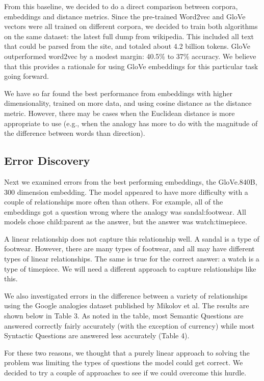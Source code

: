 \documentclass[11pt]{article}
\begin{document}
From this baseline, we decided to do a direct comparison between corpora,
embeddings and distance metrics. Since the pre-trained Word2vec and GloVe
vectors were all trained on different corpora, we decided to train both
algorithms on the same dataset: the latest full dump from wikipedia. This
included all text that could be parsed from the site, and totaled about 4.2
billion tokens. GloVe outperformed word2vec by a modest margin: 40.5\% to 37\%
accuracy. We believe that this provides a rationale for using GloVe embeddings
for this particular task going forward.

We have so far found the best performance from embeddings with higher
dimensionality, trained on more data, and using cosine distance as the
distance metric. However, there may be cases when the Euclidean distance
is more appropriate to use (e.g., when the analogy has more to do with
the magnitude of the difference between words than direction).

\subsection{Error Discovery}

Next we examined errors from the best performing embeddings, the GloVe.840B, 300
dimension embedding. The model appeared to have more difficulty with a couple of
relationships more often than others. For example, all of the embeddings got a
question wrong where the analogy was sandal:footwear. All models chose
child:parent as the answer, but the answer was watch:timepiece.

A linear relationship does not capture this relationship well. A sandal
is a type of footwear. However, there are many types of footwear, and
all may have different types of linear relationships. The same is true
for the correct answer: a watch is a type of timepiece. We will need a
different approach to capture relationships like this.

We also investigated errors in the difference between a variety of
relationships using the Google analogies dataset published by Mikolov et
al. The results are shown below in Table 3. As noted in the table, most
Semantic Questions are answered correctly fairly accurately (with the
exception of currency) while most Syntactic Questions are answered less
accurately (Table 4).

For these two reasons, we thought that a purely linear approach to
solving the problem was limiting the types of questions the model could
get correct. We decided to try a couple of approaches to see if we could
overcome this hurdle.
\end{document}
